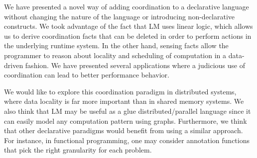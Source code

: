 We have presented a novel way of adding coordination to a declarative language without
changing the nature of the language or introducing non-declarative constructs. We
took advantage of the fact that LM uses linear logic, which allows us to derive
coordination facts that can be deleted in order to perform actions in the underlying
runtime system. In the other hand, sensing facts allow the programmer to reason
about locality and scheduling of computation in a data-driven fashion.
We have presented several applications where a judicious use of coordination can lead to
better performance behavior.

We would like to explore this coordination paradigm in distributed systems,
where data locality is far more important than in shared memory systems. We also
think that LM may be useful as a glue distributed/parallel language since it can
easily model any computation pattern using graphs. Furthermore, we think that
other declarative paradigms would benefit from using a similar approach. For
instance, in functional programming, one may consider annotation functions that
pick the right granularity for each problem.
